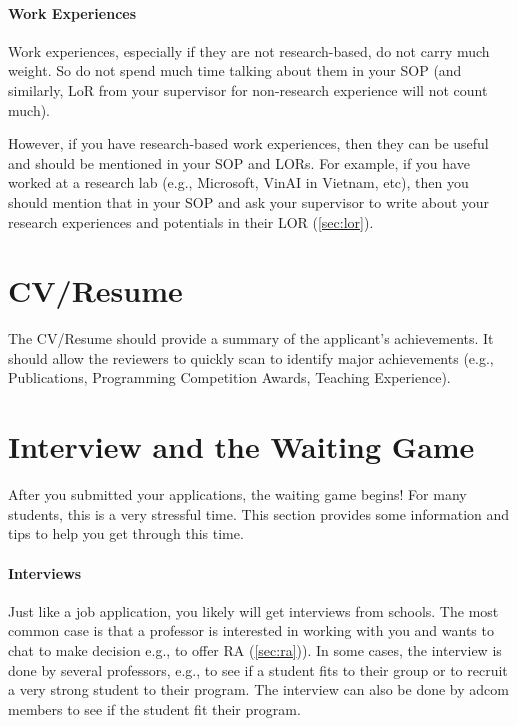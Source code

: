\documentclass[oneside,11pt]{book}
\begin{document}
\paragraph{Work Experiences} Work experiences, especially if they are not research-based, do not carry much weight. So do not spend much time talking about them in your SOP (and similarly, LoR from your supervisor for non-research experience will not count much).  

However, if you have research-based work experiences, then they can be useful and should be mentioned in your SOP and LORs. For example, if you have worked at a research lab (e.g., Microsoft, VinAI in Vietnam, etc), then you should mention that in your SOP and ask your supervisor to write about your research experiences and potentials in their LOR (\autoref{sec:lor}).


\section{CV/Resume}
The CV/Resume should provide a summary of the applicant's achievements.  It should allow the reviewers to quickly scan to identify major achievements (e.g., Publications, Programming Competition Awards, Teaching Experience).

\section{Interview and the Waiting Game}\label{sec:interview}

After you submitted your applications, the waiting game begins! For many students, this is a very stressful time. This section provides some information and tips to help you get through this time.

\paragraph{Interviews} Just like a job application, you likely will get interviews from schools. The most common case is that a professor is interested in working with you and wants to chat to make decision e.g., to offer RA (\autoref{sec:ra})). In some cases, the interview is done by several professors, e.g., to see if a student fits to their group or to recruit a very strong student to their program. The interview can also be done by adcom members to see if the student fit their program.
\end{document}
